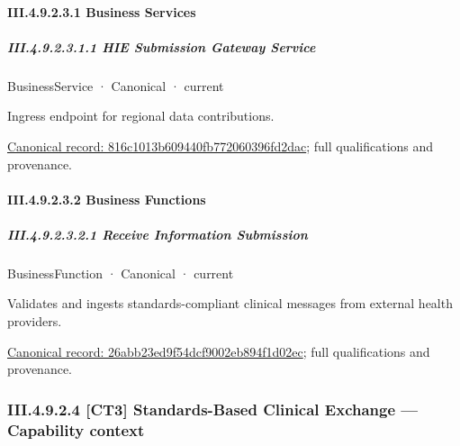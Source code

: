 \paragraph*{III.4.9.2.3.1 Business Services}
\label{navigation:III.4.9.2.3.1}

\subparagraph*{III.4.9.2.3.1.1 HIE Submission Gateway Service}
\label{navigation:III.4.9.2.3.1.1}

\label{element:816c1013b609440fb772060396fd2dac}
{\small BusinessService · Canonical · current}\par

Ingress endpoint for regional data contributions.


{\footnotesize \href{../../../../../../../continuum/business/business-service/816c1013b609440fb772060396fd2dac.md}{Canonical record: 816c1013b609440fb772060396fd2dac}; full qualifications and provenance.}\par
\paragraph*{III.4.9.2.3.2 Business Functions}
\label{navigation:III.4.9.2.3.2}

\subparagraph*{III.4.9.2.3.2.1 Receive Information Submission}
\label{navigation:III.4.9.2.3.2.1}

\label{element:26abb23ed9f54dcf9002eb894f1d02ec}
{\small BusinessFunction · Canonical · current}\par

Validates and ingests standards-compliant clinical messages from external health providers.


{\footnotesize \href{../../../../../../../continuum/business/business-function/26abb23ed9f54dcf9002eb894f1d02ec.md}{Canonical record: 26abb23ed9f54dcf9002eb894f1d02ec}; full qualifications and provenance.}\par
\subsubsection*{III.4.9.2.4 [CT3] Standards-Based Clinical Exchange — Capability context}
\label{navigation:III.4.9.2.4}


